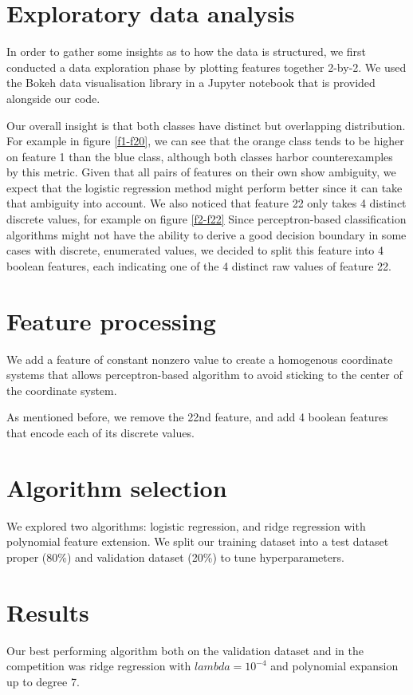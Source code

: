 \documentclass[10pt,conference,compsocconf]{IEEEtran}
\begin{document}
\section{Exploratory data analysis}
In order to gather some insights as to how the data is structured, we first conducted a data exploration phase by plotting features together 2-by-2.
We used the Bokeh data visualisation library in a Jupyter notebook that is provided alongside our code.

Our overall insight is that both classes have distinct but overlapping distribution. For example in figure \ref{f1-f20}, we can see that the orange class tends to be higher on feature 1 than the blue class, although both classes harbor counterexamples by this metric. Given that all pairs of features on their own show ambiguity, we expect that the logistic regression method might perform better since it can take that ambiguity into account. We also noticed that feature 22 only takes 4 distinct discrete values, for example on figure \ref{f2-f22} Since perceptron-based classification algorithms might not have the ability to derive a good decision boundary in some cases with discrete, enumerated values, we decided to split this feature into 4 boolean features, each indicating one of the 4 distinct raw values of feature 22.

\section{Feature processing}
We add a feature of constant nonzero value to create a homogenous coordinate systems that allows perceptron-based algorithm to avoid sticking to the center of the coordinate system.

As mentioned before, we remove the 22nd feature, and add 4 boolean features that encode each of its discrete values.
\section{Algorithm selection}
We explored two algorithms: logistic regression, and ridge regression with polynomial feature extension. We split our training dataset into a test dataset proper (80\%) and validation dataset (20\%) to tune hyperparameters.
\section{Results}
Our best performing algorithm both on the validation dataset and in the competition was ridge regression with $lambda = 10^{-4}$ and polynomial expansion up to degree 7.
\end{document}
